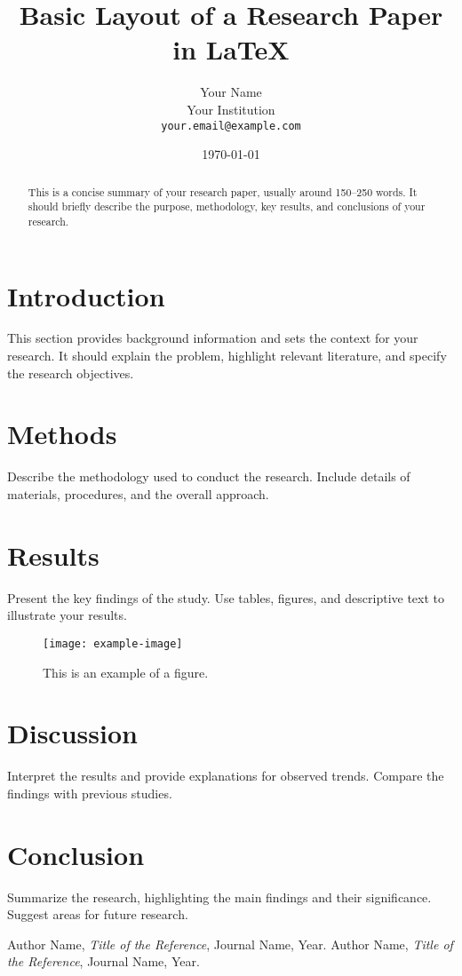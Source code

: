 \documentclass[12pt]{article}
\begin{document}
\title{Basic Layout of a Research Paper in \LaTeX}
\author{Your Name\\Your Institution\\\texttt{your.email@example.com}}
\date{\today}
\maketitle

\begin{abstract}
This is a concise summary of your research paper, usually around 150–250 words. It should briefly describe the purpose, methodology, key results, and conclusions of your research.
\end{abstract}

\tableofcontents  %
\newpage          %

\section{Introduction}
This section provides background information and sets the context for your research. It should explain the problem, highlight relevant literature, and specify the research objectives.

\section{Methods}
Describe the methodology used to conduct the research. Include details of materials, procedures, and the overall approach.

\section{Results}
Present the key findings of the study. Use tables, figures, and descriptive text to illustrate your results. 

\begin{figure}[h]
    \centering
    \texttt{[image: example-image]} %
    \caption{This is an example of a figure.}
    \label{fig:example}
\end{figure}

\section{Discussion}
Interpret the results and provide explanations for observed trends. Compare the findings with previous studies.

\section{Conclusion}
Summarize the research, highlighting the main findings and their significance. Suggest areas for future research.

\begin{thebibliography}{9}
 Author Name, \textit{Title of the Reference}, Journal Name, Year.
 Author Name, \textit{Title of the Reference}, Journal Name, Year.
\end{thebibliography}
\end{document}
